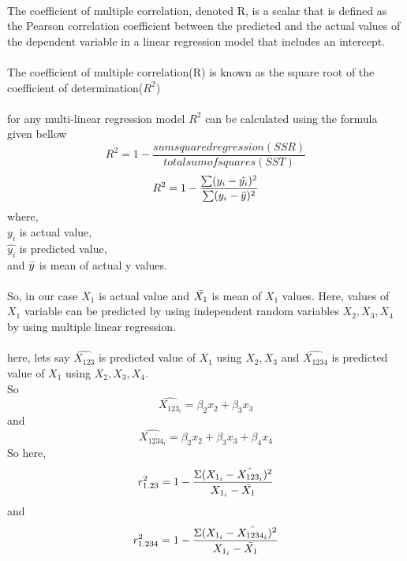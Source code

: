 \documentclass{article}
\begin{document}
\paragraph{}
The coefficient of multiple correlation, denoted R, is a scalar that is defined as the Pearson correlation coefficient between the predicted and the actual values of the dependent variable in a linear regression model that includes an intercept.
\\\\
The coefficient of multiple correlation(R) is known as the square root of the coefficient of determination(\(R^2\))
\\\\
for any multi-linear regression model \(R^2\) can be calculated using the formula given bellow\\
\begin{equation}
    R^2 = 1 - \frac{sum squared regression (SSR)}{total sum of squares (SST)}
\end{equation}\begin{equation}
    R^2 = 1 - \frac{\sum(y_i - \hat{y_i})^2}{\sum(y_i - \Bar{y})^2}\\
\end{equation}
where,\\
\hspace*{1em} \quad \quad    \(y_i\) is actual value,\\
\hspace*{1em} \quad \quad    \(\hat{y_i}\) is predicted value,\\
\hspace*{1em} \quad \quad    and \(\Bar{y}\) is mean of actual y values.


\paragraph{}
So, in our case \(X_1\) is actual value and \(\Bar{X_1}\) is mean of \(X_1\) values. Here, values of \(X_1\) variable can be predicted by using independent random variables \(X_2,X_3,X_4\) by using multiple linear regression.
\paragraph{}
here, lets say \(\hat{X_{123}}\) is predicted value of \(X_1\) using \(X_2, X_3\) and \(\hat{X_{1234}}\) is predicted value of \(X_1\) using \(X_2, X_3,X_4\).
\\
So \begin{equation}
    \hat{X_{123_i}} = \beta_2x_2  + \beta_3x_3
\end{equation} 
and \begin{equation}
\hat{X_{1234_i}} = \beta_2x_2 + \beta_3x_3 + \beta_4x_4    
\end{equation}
So here,
\begin{equation}
    r_{1.23}^2 = 1 - \frac{\Sigma(X_{1_i} - \hat{X_{123_i}})^2}{X_{1_i} - \Bar{X_1}}
\end{equation}
and
\begin{equation}
    r_{1.234}^2 = 1 - \frac{\Sigma(X_{1_i} - \hat{X_{1234_i}})^2}{X_{1_i} - \Bar{X_1}}
\end{equation}
\end{document}
